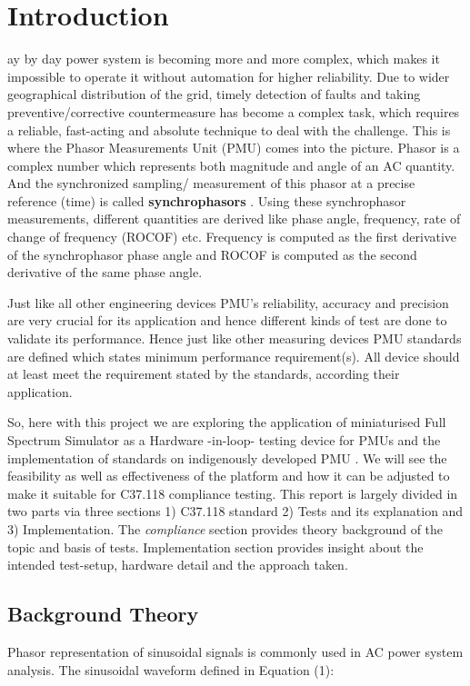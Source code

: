 \section{Introduction}
ay by day power system is becoming more and more complex, which makes it impossible to operate it without automation for higher reliability. Due to wider geographical distribution of the grid, timely detection of faults and taking preventive/corrective countermeasure  has become a complex task, which requires a reliable, fast-acting and absolute technique to deal with the challenge. This is where the Phasor Measurements Unit (PMU) comes into the picture. Phasor is a complex number which represents both magnitude and angle of an AC quantity. And the synchronized sampling/ measurement of this phasor at a precise reference (time) is called \textbf{synchrophasors} \cite{std:c37}. Using these synchrophasor measurements, different quantities are derived like phase angle, frequency, rate of change of frequency (ROCOF) etc. Frequency is computed as the first derivative of the synchrophasor phase angle and ROCOF is computed as the second derivative of the same phase angle. 

Just like all other engineering devices PMU's reliability, accuracy  and precision are very crucial for its application and hence different kinds of test are done to validate its performance. Hence just like other measuring devices PMU standards are defined which states minimum performance requirement(s). All device should at least meet the requirement stated by the standards, according their application. 

So, here with this project we are exploring the application of miniaturised Full Spectrum Simulator as a Hardware -in-loop- testing device for PMUs and the implementation of standards on indigenously developed PMU . We will see the feasibility as well as effectiveness of the platform and how it can be adjusted to make it suitable for C37.118 compliance testing. This report is largely divided in two parts via three sections 1) C37.118 standard 2) Tests and its explanation and 3) Implementation. The \textit{compliance} section provides theory background of the topic and basis of tests. Implementation section provides insight about the intended test-setup, hardware detail and the approach taken. 

\subsection{Background Theory}
Phasor representation of sinusoidal signals is commonly used in AC power system analysis. The sinusoidal waveform defined in Equation (1):

